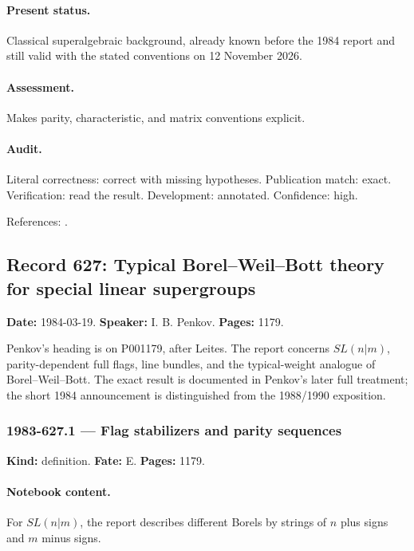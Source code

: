 \paragraph{Present status.} Classical superalgebraic background, already known before the 1984 report and still valid with the stated conventions on 12 November 2026.

\paragraph{Assessment.} Makes parity, characteristic, and matrix conventions explicit.

\paragraph{Audit.} Literal correctness: correct with missing hypotheses. Publication match: exact. Verification: read the result. Development: annotated. Confidence: high.

\noindent References: \citep{poletaeva2010matrix,kac1977sketch}.\par

\subsection{Record 627: Typical Borel–Weil–Bott theory for special linear supergroups}

\label{talk:627}

\noindent\textbf{Date:} 1984-03-19. \textbf{Speaker:} I. B. Penkov. \textbf{Pages:} 1179.\par

Penkov’s heading is on P001179, after Leites. The report concerns \(SL(n|m)\), parity-dependent full flags, line bundles, and the typical-weight analogue of Borel–Weil–Bott. The exact result is documented in Penkov’s later full treatment; the short 1984 announcement is distinguished from the 1988/1990 exposition.

\subsubsection{1983-627.1 --- Flag stabilizers and parity sequences}

\label{item:1983-627.1}

\noindent\textbf{Kind:} definition. \textbf{Fate:} E. \textbf{Pages:} 1179.\par

\paragraph{Notebook content.} For \(SL(n|m)\), the report describes different Borels by strings of \(n\) plus signs and \(m\) minus signs.

